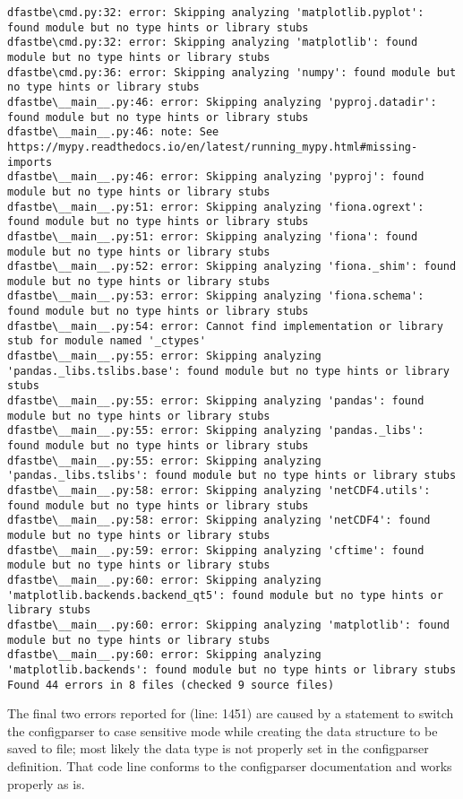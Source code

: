 \begin{Verbatim}[fontsize=\tiny]
dfastbe\cmd.py:32: error: Skipping analyzing 'matplotlib.pyplot': found module but no type hints or library stubs
dfastbe\cmd.py:32: error: Skipping analyzing 'matplotlib': found module but no type hints or library stubs
dfastbe\cmd.py:36: error: Skipping analyzing 'numpy': found module but no type hints or library stubs
dfastbe\__main__.py:46: error: Skipping analyzing 'pyproj.datadir': found module but no type hints or library stubs
dfastbe\__main__.py:46: note: See https://mypy.readthedocs.io/en/latest/running_mypy.html#missing-imports
dfastbe\__main__.py:46: error: Skipping analyzing 'pyproj': found module but no type hints or library stubs
dfastbe\__main__.py:51: error: Skipping analyzing 'fiona.ogrext': found module but no type hints or library stubs
dfastbe\__main__.py:51: error: Skipping analyzing 'fiona': found module but no type hints or library stubs
dfastbe\__main__.py:52: error: Skipping analyzing 'fiona._shim': found module but no type hints or library stubs
dfastbe\__main__.py:53: error: Skipping analyzing 'fiona.schema': found module but no type hints or library stubs
dfastbe\__main__.py:54: error: Cannot find implementation or library stub for module named '_ctypes'
dfastbe\__main__.py:55: error: Skipping analyzing 'pandas._libs.tslibs.base': found module but no type hints or library stubs
dfastbe\__main__.py:55: error: Skipping analyzing 'pandas': found module but no type hints or library stubs
dfastbe\__main__.py:55: error: Skipping analyzing 'pandas._libs': found module but no type hints or library stubs
dfastbe\__main__.py:55: error: Skipping analyzing 'pandas._libs.tslibs': found module but no type hints or library stubs
dfastbe\__main__.py:58: error: Skipping analyzing 'netCDF4.utils': found module but no type hints or library stubs
dfastbe\__main__.py:58: error: Skipping analyzing 'netCDF4': found module but no type hints or library stubs
dfastbe\__main__.py:59: error: Skipping analyzing 'cftime': found module but no type hints or library stubs
dfastbe\__main__.py:60: error: Skipping analyzing 'matplotlib.backends.backend_qt5': found module but no type hints or library stubs
dfastbe\__main__.py:60: error: Skipping analyzing 'matplotlib': found module but no type hints or library stubs
dfastbe\__main__.py:60: error: Skipping analyzing 'matplotlib.backends': found module but no type hints or library stubs
Found 44 errors in 8 files (checked 9 source files)
\end{Verbatim}

The final two errors reported for  (line: 1451) are caused by a statement to switch the configparser to case sensitive mode while creating the data structure to be saved to file; most likely the data type is not properly set in the configparser definition.
That code line conforms to the configparser documentation and works properly as is.

